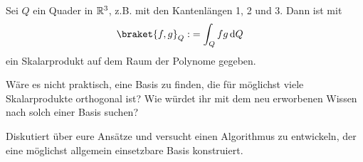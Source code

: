 \begin{example}
	Sei $Q$ ein Quader in $\mathbb{R}^3$, z.B. mit den Kantenlängen 1, 2 und 3. Dann ist mit
	\begin{align*}
		\braket{f,g}_Q :&= \int_Q f g \dd Q
	\end{align*}
	ein Skalarprodukt auf dem Raum der Polynome gegeben.
\end{example}

\begin{centralquestion}
Wäre es nicht praktisch, eine Basis zu finden, die für möglichst viele Skalarprodukte orthogonal ist? Wie würdet ihr mit dem neu erworbenen Wissen nach solch einer Basis suchen?

Diskutiert über eure Ansätze und versucht einen Algorithmus zu entwickeln, der eine möglichst allgemein einsetzbare Basis konstruiert.
\end{centralquestion}


